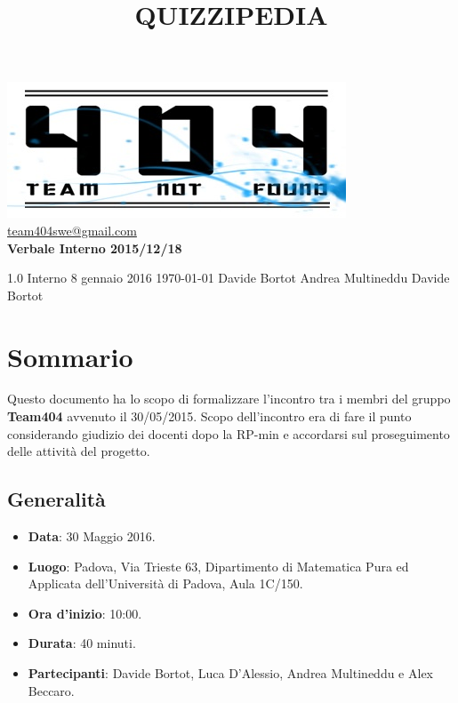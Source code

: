 \documentclass[a4paper,11pt]{article}
\title{\textbf{{\fontsize{10mm}{6mm}\selectfont QUIZZIPEDIA}}}
\begin{document}
	\maketitle
	
	\begin{center}

	\includegraphics{../../../team_not_found.jpg}\\	
	\fontsize{5mm}{3mm}\url{team404swe@gmail.com}\\
	\vspace{40mm}
	\textbf{ Verbale Interno 2015/12/18 }
	\end{center}
	\thispagestyle{empty}	%
			{1.0} 							%
			{Interno} 						%
			{8 gennaio 2016} 				%
			{\today} 						%
			{Davide Bortot}					%
			{Andrea Multineddu} 			%
			{Davide Bortot} 				%
	
	\newpage
	\section{Sommario}
	Questo documento ha lo scopo di formalizzare l'incontro tra i membri del gruppo \textbf{Team404} avvenuto il 30/05/2015. Scopo dell'incontro era di fare il punto considerando giudizio dei docenti dopo la RP-min e accordarsi sul proseguimento delle attività del progetto. 
	\subsection{Generalità}
	\begin{itemize}
	\item\textbf{Data}: 30 Maggio 2016.
	\item\textbf{Luogo}: Padova, Via Trieste 63, Dipartimento di Matematica Pura ed Applicata dell'Università di Padova, Aula 1C/150.
	\item\textbf{Ora d'inizio}: 10:00.
	\item\textbf{Durata}: 40 minuti.
	\item\textbf{Partecipanti}: Davide Bortot, Luca D'Alessio, Andrea Multineddu e Alex Beccaro.
	\end{itemize}
\end{document}
